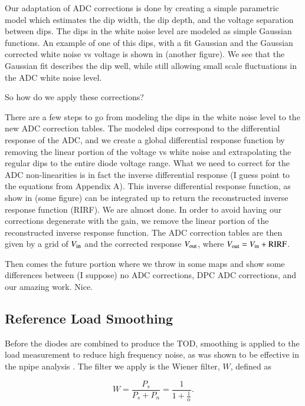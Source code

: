 \documentclass[twocolumn]{aa}
\begin{document}
Our adaptation of ADC corrections is done by creating a simple parametric model which estimates the dip width, the dip depth, and the voltage separation between dips. The dips in the white noise level are modeled as simple Gaussian functions. An example of one of this dips, with a fit Gaussian and the Gaussian corrected white noise vs voltage is shown in (another figure). We see that the Gaussian fit describes the dip well, while still allowing small scale fluctuations in the ADC white noise level. 

So how do we apply these corrections?

There are a few steps to go from modeling the dips in the white noise level to the new ADC correction tables. The modeled dips correspond to the differential response of the ADC, and we create a global differential response function by removing the linear portion of the voltage vs white noise and extrapolating the regular dips to the entire diode voltage range. What we need to correct for the ADC non-linearities is in fact the inverse differential response (I guess point to the equations from \citep{planck2013-p02a} Appendix A). This inverse differential response function, as show in (some figure) can be integrated up to return the reconstructed inverse response function (RIRF). We are almost done. In order to avoid having our corrections degenerate with the gain, we remove the linear portion of the reconstructed inverse response function. The ADC correction tables are then given by a grid of $V_{\rm in}$ and the corrected response $V_{\rm out}$, where $V_{\rm out} = V_{\rm in} + \mathrm{RIRF}$.

Then comes the future portion where we throw in some maps and show some differences between (I suppose) no ADC corrections, DPC ADC corrections, and our amazing work. Nice.

\subsection{Reference Load Smoothing}
\label{sec:refsmoothe}

Before the diodes are combined to produce the TOD, smoothing is applied to the load measurement to reduce high frequency noise, as was shown to be effective in the npipe analysis \citep{npipe}. The filter we apply is the Wiener filter, $W$, defined as 

\begin{equation}
\label{eq:wiener}
W = \frac{P_s}{P_s + P_n} = \frac{1}{1+\frac{1}{\alpha}}. 
\end{equation}
\end{document}
